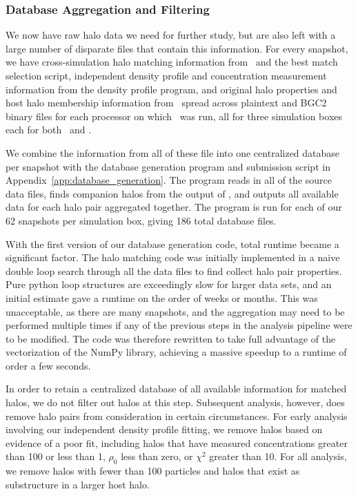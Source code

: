 \subsubsection{Database Aggregation and Filtering}
\label{subsubsec:analysis--catalog--aggregation}


We now have raw halo data we need for further study, but are also left with a large number of disparate files that contain this information.  For every snapshot, we have cross-simulation halo matching information from \crossmatch\ and the best match selection script, independent density profile and concentration measurement information from the density profile program, and original halo properties and host halo membership information from \rockstar\ spread across plaintext and BGC2 binary files for each processor on which \rockstar\ was run, all for three simulation boxes each for both \lpt\ and \za.

We combine the information from all of these file into one centralized database per snapshot with the database generation program and submission script in Appendix~\ref{app:database_generation}.  The program reads in all of the source data files, finds companion halos from the output of \crossmatch, and outputs all available data for each halo pair aggregated together.  The program is run for each of our 62 snapshots per simulation box, giving 186 total database files.

With the first version of our database generation code, total runtime became a significant factor.  The halo matching code was initially implemented in a naive double loop search through all the data files to find collect halo pair properties.  Pure python loop structures are exceedingly slow for larger data sets, and an initial estimate gave a runtime on the order of weeks or months.  This was unacceptable, as there are many snapshots, and the aggregation may need to be performed multiple times if any of the previous steps in the analysis pipeline were to be modified.  The code was therefore rewritten to take full advantage of the vectorization of the NumPy library, achieving a massive speedup to a runtime of order a few seconds.

In order to retain a centralized database of all available information for matched halos, we do not filter out halos at this step.  Subsequent analysis, however, does remove halo pairs from consideration in certain circumstances.  For early analysis involving our independent density profile fitting, we remove halos based on evidence of a poor fit, including halos that have measured concentrations greater than 100 or less than 1, $\rho_{0}$ less than zero, or $\chi^{2}$ greater than 10.  For all analysis, we remove halos with fewer than 100 particles and halos that exist as substructure in a larger host halo.




